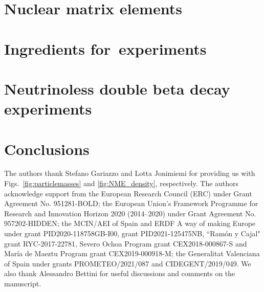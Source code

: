 \documentclass[sn-mathphys]{sn-jnl}%
\begin{document}
\section{Nuclear matrix elements} \label{sec:nme}


\section{Ingredients for\bbonu\ experiments} \label{sec:ingredients}


\section{Neutrinoless double beta decay experiments} \label{sec:experiments}


\section{Conclusions}



\backmatter

The authors thank Stefano Gariazzo and Lotta Jonimiemi for providing us with Figs.~\ref{fig:particlemasses} and \ref{fig:NME_density}, respectively. The authors acknowledge support from the European Research Council (ERC) under Grant Agreement No. 951281-BOLD; the European Union’s Framework Programme for Research and Innovation Horizon 2020 (2014–2020) under Grant Agreement No. 957202-HIDDEN; the MCIN/AEI of Spain and ERDF A way of making Europe under grant PID2020-118758GB-I00, grant PID2021-125475NB, ``Ram\'on y Cajal" grant RYC-2017-22781, Severo Ochoa Program grant CEX2018-000867-S and Mar\'ia de Maeztu Program grant CEX2019-000918-M; the Generalitat Valenciana of Spain under grants PROMETEO/2021/087 and CIDEGENT/2019/049. We also thank Alessandro Bettini for useful discussions and comments on the manuscript.




\end{document}
